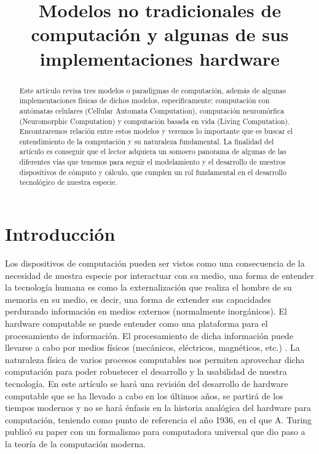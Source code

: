 \documentclass[conference]{IEEEtran}
\begin{document}
\title{Modelos no tradicionales de computación y algunas de sus implementaciones hardware}

\author{
}

\maketitle

\begin{abstract}
Este artículo revisa tres modelos o paradigmas de computación, además de algunas implementaciones físicas de dichos modelos, específicamente: computación con autómatas celulares (Cellular Automata Computation), computación neuromórfica (Neuromorphic Computation) y computación basada en vida (Living Computation). Encontraremos relación entre estos modelos y veremos lo importante que es buscar el entendimiento de la computación y su naturaleza fundamental.  La finalidad del artículo es conseguir que el lector adquiera un somoero panorama de algunas de las diferentes vías que tenemos para seguir el modelamiento y el desarrollo de nuestros dispositivos de cómputo y cálculo, que cumplen un rol fundamental en el desarrollo tecnológico de nuestra especie.
\end{abstract}

\section{Introducción}
Los dispositivos de computación pueden ser vistos como una consecuencia de la necesidad de nuestra especie por interactuar con su medio, una forma de entender la tecnología humana es como la externalización que realiza el hombre de su memoria en su medio, es decir, una forma de extender sus capacidades perdurando información en medios externos (normalmente inorgánicos). El hardware computable se puede entender como una plataforma para el procesamiento de información. El procesamiento de dicha información puede llevarse a cabo por medios físicos (mecánicos, eléctricos, magnéticos, etc.) \cite{duchesneau2014computing}\cite{piccinini2010computation}. La naturaleza física de varios procesos computables nos permiten aprovechar dicha computación para poder robustecer el desarrollo y la usabilidad de nuestra tecnología. En este artículo se hará una revisión del desarrollo de hardware computable que se ha llevado a cabo en los últimos años, se partirá de los tiempos modernos y no se hará énfasis en la historia analógica del hardware para computación, teniendo como punto de referencia el año 1936, en el que A. Turing publicó su paper con un formalismo para computadora universal \cite{turing1936a}\cite{dodig2011significance}\cite{eberbach2004turing} que dio paso a la teoría de la computación moderna.
\end{document}
